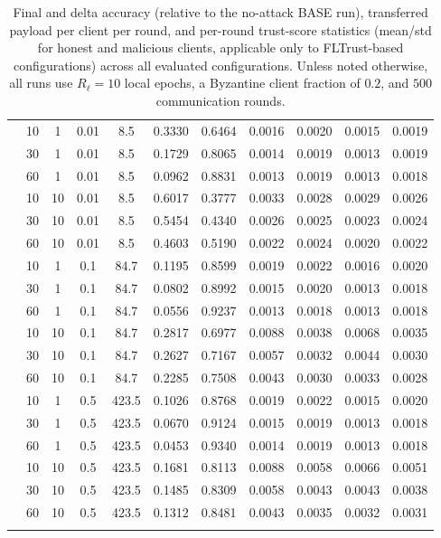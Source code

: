 \begin{longtable}{@{}l c c c c c c c c c c@{}}
	\arrayrulecolor{gray!60}\midrule\arrayrulecolor{black}
	\multirow{18}{*}{\textbf{ALL}} & 10 & 1 & 0.01 & 8.5 & 0.3330 & 0.6464 & 0.0016 & 0.0020 & 0.0015 & 0.0019 \\
	& 30 & 1 & 0.01 & 8.5 & 0.1729 & 0.8065 & 0.0014 & 0.0019 & 0.0013 & 0.0019 \\
	& 60 & 1 & 0.01 & 8.5 & 0.0962 & 0.8831 & 0.0013 & 0.0019 & 0.0013 & 0.0018 \\
	& 10 & 10 & 0.01 & 8.5 & 0.6017 & 0.3777 & 0.0033 & 0.0028 & 0.0029 & 0.0026 \\
	& 30 & 10 & 0.01 & 8.5 & 0.5454 & 0.4340 & 0.0026 & 0.0025 & 0.0023 & 0.0024 \\
	& 60 & 10 & 0.01 & 8.5 & 0.4603 & 0.5190 & 0.0022 & 0.0024 & 0.0020 & 0.0022 \\
	& 10 & 1 & 0.1 & 84.7 & 0.1195 & 0.8599 & 0.0019 & 0.0022 & 0.0016 & 0.0020 \\
	& 30 & 1 & 0.1 & 84.7 & 0.0802 & 0.8992 & 0.0015 & 0.0020 & 0.0013 & 0.0018 \\
	& 60 & 1 & 0.1 & 84.7 & 0.0556 & 0.9237 & 0.0013 & 0.0018 & 0.0013 & 0.0018 \\
	& 10 & 10 & 0.1 & 84.7 & 0.2817 & 0.6977 & 0.0088 & 0.0038 & 0.0068 & 0.0035 \\
	& 30 & 10 & 0.1 & 84.7 & 0.2627 & 0.7167 & 0.0057 & 0.0032 & 0.0044 & 0.0030 \\
	& 60 & 10 & 0.1 & 84.7 & 0.2285 & 0.7508 & 0.0043 & 0.0030 & 0.0033 & 0.0028 \\
	& 10 & 1 & 0.5 & 423.5 & 0.1026 & 0.8768 & 0.0019 & 0.0022 & 0.0015 & 0.0020 \\
	& 30 & 1 & 0.5 & 423.5 & 0.0670 & 0.9124 & 0.0015 & 0.0019 & 0.0013 & 0.0018 \\
	& 60 & 1 & 0.5 & 423.5 & 0.0453 & 0.9340 & 0.0014 & 0.0019 & 0.0013 & 0.0018 \\
	& 10 & 10 & 0.5 & 423.5 & 0.1681 & 0.8113 & 0.0088 & 0.0058 & 0.0066 & 0.0051 \\
	& 30 & 10 & 0.5 & 423.5 & 0.1485 & 0.8309 & 0.0058 & 0.0043 & 0.0043 & 0.0038 \\
	& 60 & 10 & 0.5 & 423.5 & 0.1312 & 0.8481 & 0.0043 & 0.0035 & 0.0032 & 0.0031 \\
	\caption{Final and delta accuracy (relative to the no-attack BASE run), transferred payload per client per round, and per-round trust-score statistics (mean/std for honest and malicious clients, applicable only to FLTrust-based configurations) across all evaluated configurations. Unless noted otherwise, all runs use $R_\ell=10$ local epochs, a Byzantine client fraction of $0.2$, and $500$ communication rounds.}
	\label{tab:accuracy-summary}
\end{longtable}
